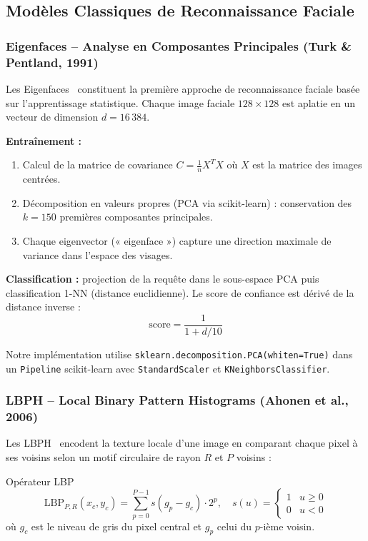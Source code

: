 \documentclass[12pt,a4paper]{article}
\begin{document}
\subsection{Modèles Classiques de Reconnaissance Faciale}

\subsubsection{Eigenfaces – Analyse en Composantes Principales (Turk \& Pentland, 1991)}

Les Eigenfaces~\cite{turk1991} constituent la première approche de reconnaissance
faciale basée sur l'apprentissage statistique. Chaque image faciale
$128 \times 128$ est aplatie en un vecteur de dimension $d = 16\,384$.

\medskip
\textbf{Entraînement :}
\begin{enumerate}
  \item Calcul de la matrice de covariance $C = \frac{1}{n} X^T X$ où $X$
        est la matrice des images centrées.
  \item Décomposition en valeurs propres (PCA via scikit-learn) : conservation
        des $k=150$ premières composantes principales.
  \item Chaque eigenvector (« eigenface ») capture une direction maximale de
        variance dans l'espace des visages.
\end{enumerate}

\textbf{Classification :} projection de la requête dans le sous-espace PCA puis
classification 1-NN (distance euclidienne). Le score de confiance est dérivé de
la distance inverse :
\[
  \text{score} = \frac{1}{1 + d/10}
\]

Notre implémentation utilise \texttt{sklearn.decomposition.PCA(whiten=True)}
dans un \texttt{Pipeline} scikit-learn avec \texttt{StandardScaler} et
\texttt{KNeighborsClassifier}.

\subsubsection{LBPH – Local Binary Pattern Histograms (Ahonen et al., 2006)}

Les LBPH~\cite{ahonen2006} encodent la texture locale d'une image en comparant
chaque pixel à ses voisins selon un motif circulaire de rayon $R$ et $P$
voisins :

\begin{formulebox}{Opérateur LBP}
\[
  \text{LBP}_{P,R}(x_c, y_c) = \sum_{p=0}^{P-1} s(g_p - g_c) \cdot 2^p,
  \quad s(u) = \begin{cases} 1 & u \geq 0 \\ 0 & u < 0 \end{cases}
\]
où $g_c$ est le niveau de gris du pixel central et $g_p$ celui du $p$-ième voisin.
\end{formulebox}
\end{document}
